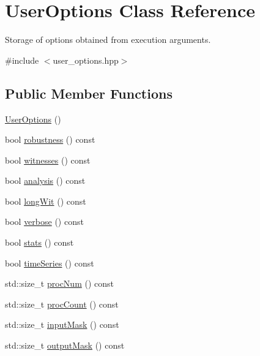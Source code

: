 \hypertarget{classUserOptions}{\section{\-User\-Options \-Class \-Reference}
\label{classUserOptions}
}


\-Storage of options obtained from execution arguments.  




{\ttfamily \#include $<$user\-\_\-options.\-hpp$>$}

\subsection*{\-Public \-Member \-Functions}
\begin{DoxyCompactItemize}
\item 
\hyperlink{classUserOptions_a477c8d918c09c047e22fee763478b47e}{\-User\-Options} ()
\item 
bool \hyperlink{classUserOptions_abbcaaca086fb7d3bdd0868ad95800212}{robustness} () const 
\item 
bool \hyperlink{classUserOptions_a5620de91cbbd3787b8891a5eca7ea0d4}{witnesses} () const 
\item 
bool \hyperlink{classUserOptions_a3a05c437bb0193e05c97d6075a236002}{analysis} () const 
\item 
bool \hyperlink{classUserOptions_a43ea432ffbca6fc3c62afc8d3779fe30}{long\-Wit} () const 
\item 
bool \hyperlink{classUserOptions_a9f333311f79b960dba6e0955cb4fcd29}{verbose} () const 
\item 
bool \hyperlink{classUserOptions_a47ba8b52479f2fee0b8358b95fd9f10e}{stats} () const 
\item 
bool \hyperlink{classUserOptions_a66600767c4b6f6ab02ca66f59f074879}{time\-Series} () const 
\item 
std\-::size\-\_\-t \hyperlink{classUserOptions_a0c2e6be99071ffd34bfc326fcf0428c5}{proc\-Num} () const 
\item 
std\-::size\-\_\-t \hyperlink{classUserOptions_a7b7a9345c0f3df61e2ff7a488a5c717c}{proc\-Count} () const 
\item 
std\-::size\-\_\-t \hyperlink{classUserOptions_aa7d408830d57e58fe174b7e31242c435}{input\-Mask} () const 
\item 
std\-::size\-\_\-t \hyperlink{classUserOptions_a92e29f3823cec251841bcd14ad95079c}{output\-Mask} () const 
\end{DoxyCompactItemize}
